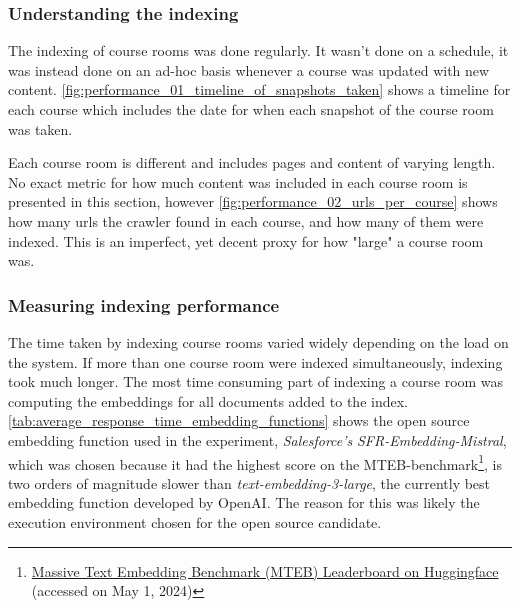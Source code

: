 


\subsubsection{Understanding the indexing}
\label{sec:understanding_indexing}


The indexing of course rooms was done regularly. It wasn’t done on a schedule, it was instead done on an ad-hoc basis whenever a course was updated with new content. \autoref{fig:performance_01_timeline_of_snapshots_taken} shows a timeline for each course which includes the date for when each snapshot of the course room was taken.





Each course room is different and includes pages and content of varying length. No exact metric for how much content was included in each course room is presented in this section, however \autoref{fig:performance_02_urls_per_course} shows how many urls the crawler found in each course, and how many of them were indexed. This is an imperfect, yet decent proxy for how "large" a course room was.





\subsubsection{Measuring indexing performance}
\label{sec:measuring_indexing_performance}


The time taken by indexing course rooms varied widely depending on the load on the system. If more than one course room were indexed simultaneously, indexing took much longer. The most time consuming part of indexing a course room was computing the embeddings for all documents added to the index. \autoref{tab:average_response_time_embedding_functions} shows the open source embedding function used in the experiment, \textit{Salesforce’s} \textit{SFR-Embedding-Mistral}\cite{meng_sfr-embedding-mistral_2024}, which was chosen because it had the highest score on the \gls{MTEB}-benchmark\footnote{\href{https://huggingface.co/spaces/mteb/leaderboard}{Massive Text Embedding Benchmark (MTEB) Leaderboard on Huggingface} (accessed on May 1, 2024)}, is two orders of magnitude slower than \textit{text-embedding-3-large}, the currently best embedding function developed by OpenAI. The reason for this was likely the execution environment chosen for the open source candidate.


